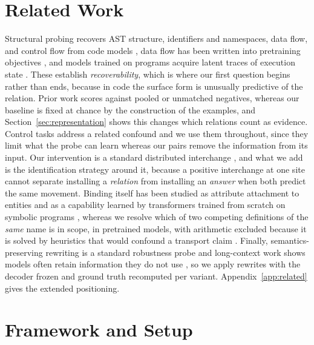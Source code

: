 \documentclass{article}
\begin{document}
\section{Related Work}
\label{sec:related}

Structural probing recovers AST structure, identifiers and namespaces, data flow, and control flow from code models \citep{wan2022capture,hernandez2022astprobe,troshin2022probing,ma2024unveiling}, data flow has been written into pretraining objectives \citep{guo2021graphcodebert}, and models trained on programs acquire latent traces of execution state \citep{jin2024emergent}. These establish \emph{recoverability}, which is where our first question begins rather than ends, because in code the surface form is unusually predictive of the relation. Prior work scores against pooled or unmatched negatives, whereas our baseline is fixed at chance by the construction of the examples, and Section~\ref{sec:representation} shows this changes which relations count as evidence. Control tasks \citep{hewitt2019control} address a related confound and we use them throughout, since they limit what the probe can learn whereas our pairs remove the information from its input. Our intervention is a standard distributed interchange \citep{geiger2023alignments,wu2023boundless,huang2024ravel,zhang2023patching}, and what we add is the identification strategy around it, because a positive interchange at one site cannot separate installing a \emph{relation} from installing an \emph{answer} when both predict the same movement. Binding itself has been studied as attribute attachment to entities \citep{feng2024binding} and as a capability learned by transformers trained from scratch on symbolic programs \citep{wu2025variablebinding}, whereas we resolve which of two competing definitions of the \emph{same} name is in scope, in pretrained models, with arithmetic excluded because it is solved by heuristics that would confound a transport claim \citep{nikankin2024arithmetic}. Finally, semantics-preserving rewriting is a standard robustness probe and long-context work shows models often retain information they do not use \citep{lu2024longcontext}, so we apply rewrites with the decoder frozen and ground truth recomputed per variant. Appendix~\ref{app:related} gives the extended positioning.

\section{Framework and Setup}
\label{sec:setup}
\end{document}
